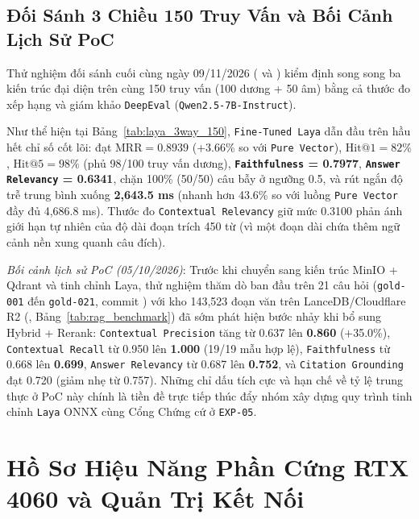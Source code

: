 \subsection{Đối Sánh 3 Chiều 150 Truy Vấn và Bối Cảnh Lịch Sử PoC}
\label{sec:ch5_3way_poc}

Thử nghiệm đối sánh cuối cùng ngày 09/11/2026 ( và ) kiểm định song song ba kiến trúc đại diện trên cùng 150 truy vấn (100 dương + 50 âm) bằng cả thước đo xếp hạng và giám khảo \texttt{DeepEval} (\texttt{Qwen2.5-7B-Instruct}).



Như thể hiện tại Bảng~\ref{tab:laya_3way_150}, \texttt{Fine-Tuned Laya} dẫn đầu trên hầu hết chỉ số cốt lõi: đạt \textbf{$\mathrm{MRR} = 0.8939$} (+3.66\% so với \texttt{Pure Vector}), \textbf{$\mathrm{Hit}@1 = 82\%$}, \textbf{$\mathrm{Hit}@5 = 98\%$} (phủ 98/100 truy vấn dương), \textbf{\texttt{Faithfulness} = 0.7977}, \textbf{\texttt{Answer Relevancy} = 0.6341}, chặn 100\% (50/50) câu bẫy ở ngưỡng 0.5, và rút ngắn độ trễ trung bình xuống \textbf{2,643.5 ms} (nhanh hơn 43.6\% so với luồng \texttt{Pure Vector} đầy đủ 4,686.8 ms). Thước đo \texttt{Contextual Relevancy} giữ mức 0.3100 phản ánh giới hạn tự nhiên của độ dài đoạn trích 450 từ (vì một đoạn dài chứa thêm ngữ cảnh nền xung quanh câu đích).

\textit{Bối cảnh lịch sử PoC (05/10/2026)}: Trước khi chuyển sang kiến trúc MinIO + Qdrant và tinh chỉnh Laya, thử nghiệm thăm dò ban đầu trên 21 câu hỏi (\texttt{gold-001} đến \texttt{gold-021}, commit ) với kho 143,523 đoạn văn trên LanceDB/Cloudflare R2 (, Bảng~\ref{tab:rag_benchmark}) đã sớm phát hiện bước nhảy khi bổ sung Hybrid + Rerank: \texttt{Contextual Precision} tăng từ 0.637 lên \textbf{0.860} (+35.0\%), \texttt{Contextual Recall} từ 0.950 lên \textbf{1.000} (19/19 mẫu hợp lệ), \texttt{Faithfulness} từ 0.668 lên \textbf{0.699}, \texttt{Answer Relevancy} từ 0.687 lên \textbf{0.752}, và \texttt{Citation Grounding} đạt 0.720 (giảm nhẹ từ 0.757). Những chỉ dấu tích cực và hạn chế về tỷ lệ trung thực ở PoC này chính là tiền đề trực tiếp thúc đẩy nhóm xây dựng quy trình tinh chỉnh \texttt{Laya} ONNX cùng Cổng Chứng cứ ở \texttt{EXP-05}.



\section{Hồ Sơ Hiệu Năng Phần Cứng RTX 4060 và Quản Trị Kết Nối}
\label{sec:ch5_hardware}

